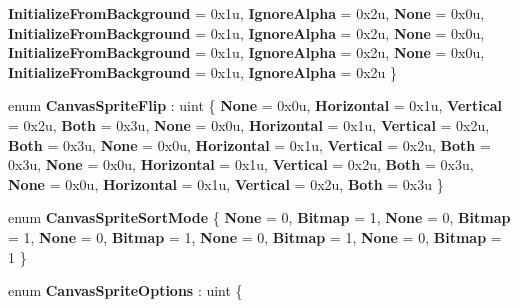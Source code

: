 \begin{DoxyCompactItemize}
{\bfseries Initialize\+From\+Background} = 0x1u, 
{\bfseries Ignore\+Alpha} = 0x2u, 
{\bfseries None} = 0x0u, 
{\bfseries Initialize\+From\+Background} = 0x1u, 
\newline
{\bfseries Ignore\+Alpha} = 0x2u, 
{\bfseries None} = 0x0u, 
{\bfseries Initialize\+From\+Background} = 0x1u, 
{\bfseries Ignore\+Alpha} = 0x2u, 
\newline
{\bfseries None} = 0x0u, 
{\bfseries Initialize\+From\+Background} = 0x1u, 
{\bfseries Ignore\+Alpha} = 0x2u
 \}
\item 
\mbox{\label{namespace_microsoft_1_1_graphics_1_1_canvas_ab01b519fa39176572bedd129db922814}} 
enum {\bfseries Canvas\+Sprite\+Flip} \+: uint \{ \newline
{\bfseries None} = 0x0u, 
{\bfseries Horizontal} = 0x1u, 
{\bfseries Vertical} = 0x2u, 
{\bfseries Both} = 0x3u, 
\newline
{\bfseries None} = 0x0u, 
{\bfseries Horizontal} = 0x1u, 
{\bfseries Vertical} = 0x2u, 
{\bfseries Both} = 0x3u, 
\newline
{\bfseries None} = 0x0u, 
{\bfseries Horizontal} = 0x1u, 
{\bfseries Vertical} = 0x2u, 
{\bfseries Both} = 0x3u, 
\newline
{\bfseries None} = 0x0u, 
{\bfseries Horizontal} = 0x1u, 
{\bfseries Vertical} = 0x2u, 
{\bfseries Both} = 0x3u, 
\newline
{\bfseries None} = 0x0u, 
{\bfseries Horizontal} = 0x1u, 
{\bfseries Vertical} = 0x2u, 
{\bfseries Both} = 0x3u
 \}
\item 
\mbox{\label{namespace_microsoft_1_1_graphics_1_1_canvas_a78964f5963aadeacf020f306893b03c8}} 
enum {\bfseries Canvas\+Sprite\+Sort\+Mode} \{ \newline
{\bfseries None} = 0, 
{\bfseries Bitmap} = 1, 
{\bfseries None} = 0, 
{\bfseries Bitmap} = 1, 
\newline
{\bfseries None} = 0, 
{\bfseries Bitmap} = 1, 
{\bfseries None} = 0, 
{\bfseries Bitmap} = 1, 
\newline
{\bfseries None} = 0, 
{\bfseries Bitmap} = 1
 \}
\item 
\mbox{\label{namespace_microsoft_1_1_graphics_1_1_canvas_ab6862b1a93938e7824d0fff2e6892380}} 
enum {\bfseries Canvas\+Sprite\+Options} \+: uint \{ \newline

\end{DoxyCompactItemize}
